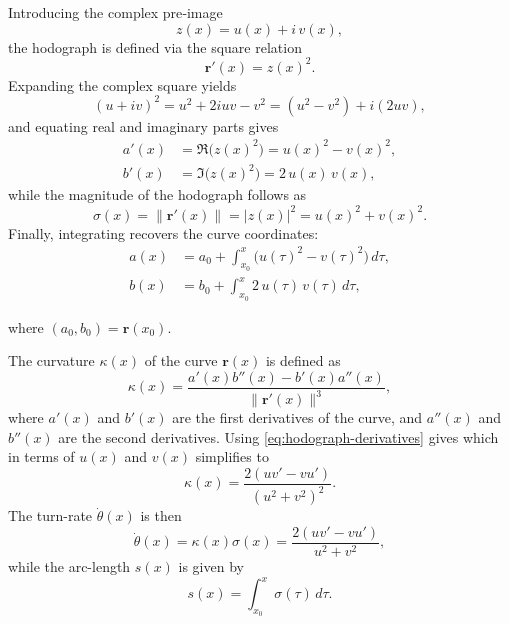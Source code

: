 Introducing the complex pre‐image
\begin{equation*}
    z(x) = u(x) + i\,v(x),
\end{equation*}
the hodograph is defined via the square relation
\begin{equation}\label{eq:hodograph-square}
    \mathbf r'(x) = z(x)^2.
\end{equation}
Expanding the complex square yields
\begin{equation*}
    (u + i v)^2 = u^2 + 2iuv - v^2 = (u^2 - v^2) + i(2uv),
\end{equation*}
and equating real and imaginary parts gives
\begin{subequations}\label{eq:hodograph-derivatives}
    \begin{align}
        a'(x) &= \Re\bigl(z(x)^2\bigr) = u(x)^2 - v(x)^2, \label{eq:hodograph-derivatives-a}\\
        b'(x) &= \Im\bigl(z(x)^2\bigr) = 2\,u(x)\,v(x), \label{eq:hodograph-derivatives-b}
    \end{align}
\end{subequations}
while the magnitude of the hodograph follows as
\begin{equation*}
    \sigma(x) = \|\mathbf r'(x)\| = |z(x)|^2 = u(x)^2 + v(x)^2.
\end{equation*}
Finally, integrating recovers the curve coordinates:
\begin{equation*}
    \begin{aligned}
        a(x) &= a_0 + \int_{x_0}^{x}\bigl(u(\tau)^2 - v(\tau)^2\bigr)\,d\tau,\\
        b(x) &= b_0 + \int_{x_0}^{x}2\,u(\tau)\,v(\tau)\,d\tau,
    \end{aligned}
\end{equation*}

where $(a_0,b_0)=\mathbf r(x_0)$.

The curvature $\kappa(x)$ of the curve $\mathbf r(x)$ is defined as
\begin{equation*}
    \kappa(x) = \frac{a'(x)b''(x) - b'(x)a''(x)}{\|\mathbf r'(x)\|^3},
\end{equation*}
where $a'(x)$ and $b'(x)$ are the first derivatives of the curve, and $a''(x)$ and $b''(x)$ are the second derivatives. Using \cref{eq:hodograph-derivatives} gives
which in terms of $u(x)$ and $v(x)$ simplifies to
\begin{equation}\label{eq:curvature}
    \kappa(x) = \frac{2(uv'-vu')}{(u^2+v^2)^2}.
\end{equation}
The turn-rate $\dot\theta(x)$ is then
\begin{equation}\label{eq:turn-rate}
    \dot\theta(x) = \kappa(x) \sigma(x) = \frac{2(uv'-vu')}{u^2+v^2},
\end{equation}
while the arc-length $s(x)$ is given by
\begin{equation*}
    s(x) = \int_{x_0}^{x}\sigma(\tau)\,d\tau.
\end{equation*}



